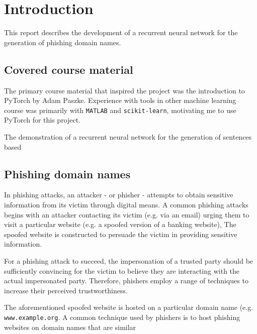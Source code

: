 \section{Introduction}
This report describes the development of a recurrent neural network for the generation of phishing domain names.

\subsection{Covered course material}
The primary course material that inspired the project was the introduction to PyTorch by Adam Paszke.
Experience with tools in other machine learning course was primarily with {\tt MATLAB} and {\tt scikit-learn}, motivating me to use PyTorch for this project.

The demonstration of a recurrent neural network for the generation of sentences based 

\subsection{Phishing domain names}
In phishing attacks, an attacker - or phisher - attempts to obtain sensitive information from its victim through digital means.
A common phishing attacks begins with an attacker contacting its victim (e.g. via an email) urging them to visit a particular website (e.g. a spoofed version of a banking website), 
The spoofed website is constructed to persuade the victim in providing sensitive information.

For a phishing attack to succeed, the impersonation of a trusted party should be sufficiently convincing for the victim to believe they are interacting with the actual impersonated party.
Therefore, phishers employ a range of techniques to increase their perceived trustworthiness.

The aforementioned spoofed website is hosted on a particular domain name (e.g. {\tt www.example.org}.
A common technique used by phishers is to host phishing websites on domain names that are similar 